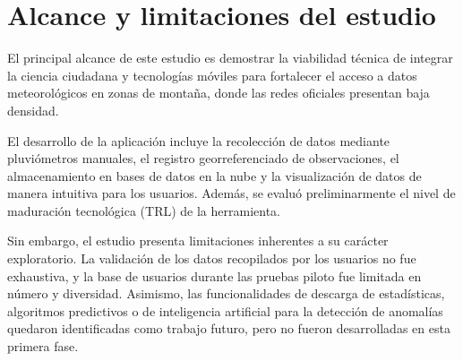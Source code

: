 \section{Alcance y limitaciones del estudio}
El principal alcance de este estudio es demostrar la viabilidad técnica de integrar la ciencia ciudadana y tecnologías móviles para fortalecer el acceso a datos meteorológicos en zonas de montaña, donde las redes oficiales presentan baja densidad.

El desarrollo de la aplicación incluye la recolección de datos mediante pluviómetros manuales, el registro georreferenciado de observaciones, el almacenamiento en bases de datos en la nube y la visualización de datos de manera intuitiva para los usuarios. Además, se evaluó preliminarmente el nivel de maduración tecnológica (TRL) de la herramienta.

Sin embargo, el estudio presenta limitaciones inherentes a su carácter exploratorio. La validación de los datos recopilados por los usuarios no fue exhaustiva, y la base de usuarios durante las pruebas piloto fue limitada en número y diversidad. Asimismo, las funcionalidades de descarga de estadísticas, algoritmos predictivos o de inteligencia artificial para la detección de anomalías quedaron identificadas como trabajo futuro, pero no fueron desarrolladas en esta primera fase.